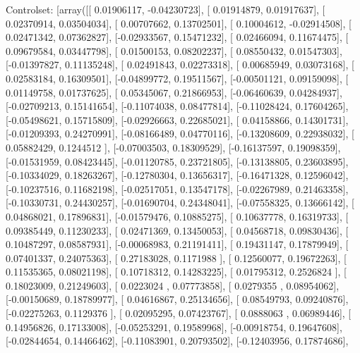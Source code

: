 \documentclass{article}
\begin{document}
Controlset: [array([[ 0.01906117, -0.04230723],
       [ 0.01914879,  0.01917637],
       [ 0.02370914,  0.03504034],
       [ 0.00707662,  0.13702501],
       [ 0.10004612, -0.02914508],
       [ 0.02471342,  0.07362827],
       [-0.02933567,  0.15471232],
       [ 0.02466094,  0.11674475],
       [ 0.09679584,  0.03447798],
       [ 0.01500153,  0.08202237],
       [ 0.08550432,  0.01547303],
       [-0.01397827,  0.11135248],
       [ 0.02491843,  0.02273318],
       [ 0.00685949,  0.03073168],
       [ 0.02583184,  0.16309501],
       [-0.04899772,  0.19511567],
       [-0.00501121,  0.09159098],
       [ 0.01149758,  0.01737625],
       [ 0.05345067,  0.21866953],
       [-0.06460639,  0.04284937],
       [-0.02709213,  0.15141654],
       [-0.11074038,  0.08477814],
       [-0.11028424,  0.17604265],
       [-0.05498621,  0.15715809],
       [-0.02926663,  0.22685021],
       [ 0.04158866,  0.14301731],
       [-0.01209393,  0.24270991],
       [-0.08166489,  0.04770116],
       [-0.13208609,  0.22938032],
       [ 0.05882429,  0.1244512 ],
       [-0.07003503,  0.18309529],
       [-0.16137597,  0.19098359],
       [-0.01531959,  0.08423445],
       [-0.01120785,  0.23721805],
       [-0.13138805,  0.23603895],
       [-0.10334029,  0.18263267],
       [-0.12780304,  0.13656317],
       [-0.16471328,  0.12596042],
       [-0.10237516,  0.11682198],
       [-0.02517051,  0.13547178],
       [-0.02267989,  0.21463358],
       [-0.10330731,  0.24430257],
       [-0.01690704,  0.24348041],
       [-0.07558325,  0.13666142],
       [ 0.04868021,  0.17896831],
       [-0.01579476,  0.10885275],
       [ 0.10637778,  0.16319733],
       [ 0.09385449,  0.11230233],
       [ 0.02471369,  0.13450053],
       [ 0.04568718,  0.09830436],
       [ 0.10487297,  0.08587931],
       [-0.00068983,  0.21191411],
       [ 0.19431147,  0.17879949],
       [ 0.07401337,  0.24075363],
       [ 0.27183028,  0.1171988 ],
       [ 0.12560077,  0.19672263],
       [ 0.11535365,  0.08021198],
       [ 0.10718312,  0.14283225],
       [ 0.01795312,  0.2526824 ],
       [ 0.18023009,  0.21249603],
       [ 0.0223024 ,  0.07773858],
       [ 0.0279355 ,  0.08954062],
       [-0.00150689,  0.18789977],
       [ 0.04616867,  0.25134656],
       [ 0.08549793,  0.09240876],
       [-0.02275263,  0.1129376 ],
       [ 0.02095295,  0.07423767],
       [ 0.0888063 ,  0.06989446],
       [ 0.14956826,  0.17133008],
       [-0.05253291,  0.19589968],
       [-0.00918754,  0.19647608],
       [-0.02844654,  0.14466462],
       [-0.11083901,  0.20793502],
       [-0.12403956,  0.17874686],
\end{document}
